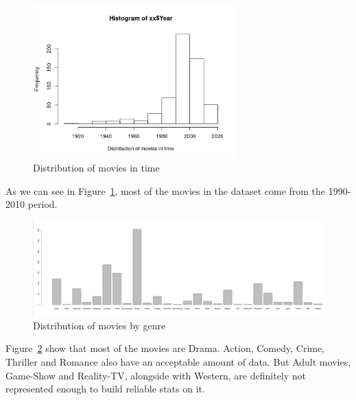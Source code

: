 \begin{figure}[!ht]
\begin{center}
\includegraphics[width=0.70\textwidth]{../src/pre-processing/stats/results/distYears.png}
\end{center}
\caption{Distribution of movies in time}
\label{fig:distYears}
\end{figure}
As we can see in Figure~\ref{fig:distYears}, most of the movies in the dataset come from the 1990-2010 period.

\begin{figure}[!ht]
\begin{center}
\includegraphics[width=1.1\textwidth]{../src/pre-processing/stats/results/Distribution genres.png}
\end{center}
\caption{Distribution of movies by genre}
\label{fig:distGenres}
\end{figure}
Figure~\ref{fig:distGenres} show that most of the movies are Drama. Action, Comedy, Crime, Thriller and Romance also have an acceptable amount of data.
But Adult movies, Game-Show and Reality-TV, alongside with Western, are definitely not represented enough to build reliable stats on it.

